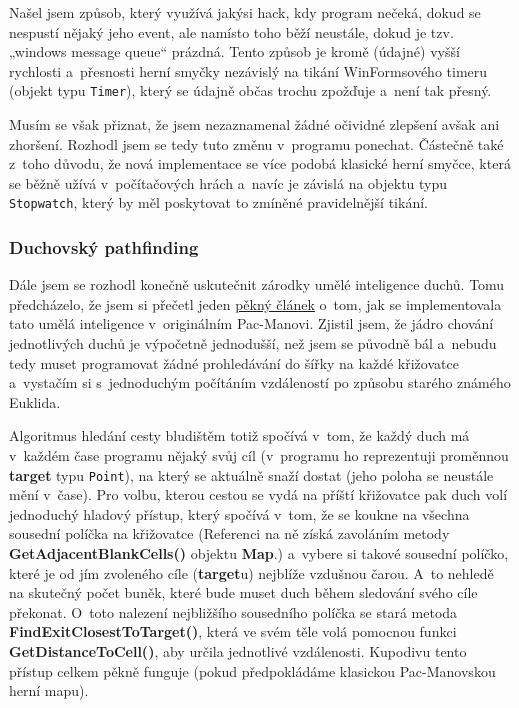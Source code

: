 \documentclass[a4]{article}
\begin{document}
Našel jsem způsob, který využívá jakýsi hack, kdy program nečeká, dokud se nespustí nějaký jeho event, ale namísto toho běží neustále, dokud je tzv. „windows message queue“ prázdná. Tento způsob je kromě (údajné) vyšší rychlosti a~přesnosti herní smyčky nezávislý na tikání WinFormsového timeru (objekt typu \verb|Timer|), který se údajně občas trochu zpožďuje a~není tak přesný. 

Musím se však přiznat, že jsem nezaznamenal žádné očividné zlepšení avšak ani zhoršení. Rozhodl jsem se tedy tuto změnu v~programu ponechat. Částečně také z~toho důvodu, že nová implementace se více podobá klasické herní smyčce, která se běžně užívá v~počítačových hrách a~navíc je závislá na objektu typu \verb|Stopwatch|, který by měl poskytovat to zmíněné pravidelnější tikání.

\subsubsection{Duchovský pathfinding} \label{ghostpathfinding}
Dále jsem se rozhodl konečně uskutečnit zárodky umělé inteligence duchů. Tomu předcházelo, že jsem si přečetl jeden \href{https://www.gamedeveloper.com/design/the-pac-man-dossier}{pěkný článek} o~tom, jak se implementovala tato umělá inteligence v~originálním Pac-Manovi. Zjistil jsem, že jádro chování jednotlivých duchů je výpočetně jednodušší, než jsem se původně bál a~nebudu tedy muset programovat žádné prohledávání do šířky na každé křižovatce a~vystačím si s~jednoduchým počítáním vzdáleností po způsobu starého známého Euklida. 

Algoritmus hledání cesty bludištěm totiž spočívá v~tom, že každý duch má v~každém čase programu nějaký svůj cíl (v~programu ho reprezentuji proměnnou \textbf{target} typu \verb|Point|), na který se aktuálně snaží dostat (jeho poloha se neustále mění v~čase). Pro volbu, kterou cestou se vydá na příští křižovatce pak duch volí jednoduchý hladový přístup, který spočívá v~tom, že se koukne na všechna sousední políčka na křižovatce (Referenci na ně získá zavoláním metody \textbf{GetAdjacentBlankCells()} objektu \textbf{Map}.) a~vybere si takové sousední políčko, které je od jím zvoleného cíle (\textbf{target}u) nejblíže vzdušnou čarou. A~to nehledě na skutečný počet buněk, které bude muset duch během sledování svého cíle překonat. O~toto nalezení nejbližšího sousedního políčka se stará metoda \textbf{FindExitClosestToTarget()}, která ve svém těle volá pomocnou funkci \textbf{GetDistanceToCell()}, aby určila jednotlivé vzdálenosti. Kupodivu tento přístup celkem pěkně funguje (pokud předpokládáme klasickou Pac-Manovskou herní mapu).
\end{document}
